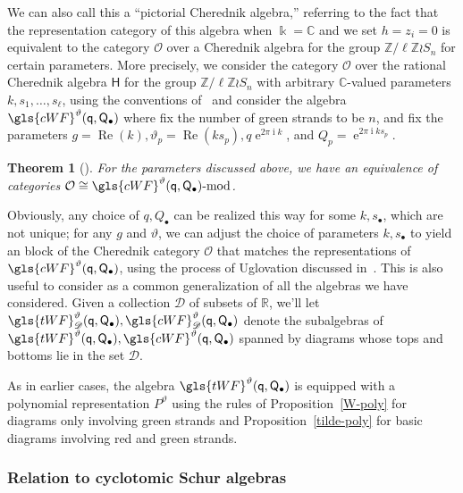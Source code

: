 \documentclass[10pt]{article}
\newtheorem{theorem}{Theorem}[section]
\theoremstyle{definition}
\DeclareMathOperator{\Rerm}{Re}
\DeclareMathOperator{\expe}{e}
\DeclareMathOperator{\ir}{i}
\newcommand{\pq}{\mathsf{q}}
\newcommand{\K}{\Bbbk}%
\newcommand{\Z}{\mathbb{Z}}
\newcommand{\R}{\mathbb{R}}
\newcommand{\Cbb}{\mathbb{C}}
\newcommand{\PQ}{\mathsf{Q}}
\newcommand{\cO}{\mathcal{O}}
\newcommand{\mmod}{\text{\upshape-mod}}
\begin{document}
We can also call this a ``pictorial
 Cherednik algebra,'' referring to the fact that the representation
 category of this algebra when $\K=\Cbb$ and we set $h=z_i=0$ is
 equivalent to the category
 $\cO$ over a Cherednik algebra for the group $\Z/\ell\Z\wr S_n$ for
 certain parameters. More precisely, we consider the category $\cO$ over the
 rational Cherednik algebra $\mathsf{H}$ for the group $\Z/\ell\Z\wr
 S_n$ with arbitrary $\Cbb$-valued parameters $k,
 s_1,\dots, s_\ell$, using the conventions of~\cite[\S~2.1]{WebRou}
 and consider the algebra
 $\gls{cWF}^\vartheta (\pq,\PQ_{\bullet})$ where fix the
 number of green strands to be $n$, and fix the parameters $g=\Rerm(k),
 \vartheta_p=\Rerm(ks_p), q\expe^{2\pi \ir k}$, and $Q_p=\expe^{2\pi \ir k s_p}$.
 \begin{theorem}[{\cite[Cor.~3.10]{WebRou}}]
 For the parameters discussed above, we have an equivalence of
 categories $\cO\cong
 \gls{cWF}^\vartheta (\pq,\PQ_{\bullet})\mmod$. 
\end{theorem}
Obviously, any choice of $q,Q_\bullet$ can be realized this way for
some $k,s_\bullet$, which are not unique; for any $g$ and $\vartheta$,
we can adjust the choice of parameters $ k,s_\bullet$ to yield an
block of the Cherednik category $\cO$ that matches the representations
of $\gls{cWF}^\vartheta (\pq,\PQ_{\bullet})$, using the process
of Uglovation discussed in~\cite[Def.~2.8]{WebRou}.
 This is also useful to consider as a common generalization of all
 the algebras we have considered. 
Given a collection ${\mathscr{D}}$ of subsets of $\R$, we'll let $\gls{tWF}^\vartheta_{\mathscr{D}}
(\pq,\PQ_{\bullet}),\gls{cWF}_{\mathscr{D}}^\vartheta (\pq,\PQ_{\bullet})$
denote the subalgebras of $\gls{tWF}^\vartheta
(\pq,\PQ_{\bullet}), \gls{cWF}^\vartheta (\pq,\PQ_{\bullet})$ spanned by
diagrams whose tops and bottoms lie in the set ${\mathscr{D}}$. 

As in earlier cases, the algebra $\gls{tWF}^\vartheta (\pq,\PQ_{\bullet})$
 is equipped with a polynomial representation $P^\vartheta$ using the rules of
 Proposition~\ref{W-poly} for diagrams only involving green strands and
 Proposition~\ref{tilde-poly} for basic diagrams involving red and
 green strands.

 \subsubsection{Relation to cyclotomic Schur algebras}
\label{sec:relation-hecke-schur}
\end{document}
